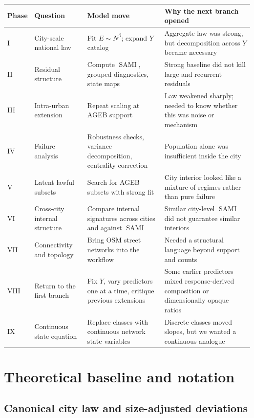 \documentclass[11pt]{article}
\newcommand{\SAMI}{\operatorname{SAMI}}
\begin{document}
\begin{longtable}{p{}p{}p{}p{}}
\toprule
\textbf{Phase} & \textbf{Question} & \textbf{Model move} & \textbf{Why the next branch opened} \\
\midrule
\endhead
I & City-scale national law & Fit \(E \sim N^\beta\); expand \(Y\) catalog & Aggregate law was strong, but decomposition across \(Y\) became necessary \\
II & Residual structure & Compute \(\SAMI\), grouped diagnostics, state maps & Strong baseline did not kill large and recurrent residuals \\
III & Intra-urban extension & Repeat scaling at AGEB support & Law weakened sharply; needed to know whether this was noise or mechanism \\
IV & Failure analysis & Robustness checks, variance decomposition, centrality correction & Population alone was insufficient inside the city \\
V & Latent lawful subsets & Search for AGEB subsets with strong fit & City interior looked like a mixture of regimes rather than pure failure \\
VI & Cross-city internal structure & Compare internal signatures across cities and against \(\SAMI\) & Similar city-level \(\SAMI\) did not guarantee similar interiors \\
VII & Connectivity and topology & Bring OSM street networks into the workflow & Needed a structural language beyond support and counts \\
VIII & Return to the first branch & Fix \(Y\), vary predictors one at a time, critique previous extensions & Some earlier predictors mixed response-derived composition or dimensionally opaque ratios \\
IX & Continuous state equation & Replace classes with continuous network state variables & Discrete classes moved slopes, but we wanted a continuous analogue \\
\bottomrule
\end{longtable}

\section{Theoretical baseline and notation}

\subsection{Canonical city law and size-adjusted deviations}
\end{document}
